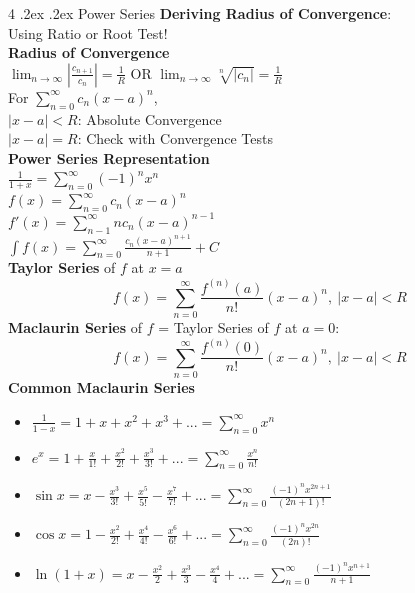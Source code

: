 \documentclass[10pt,landscape,a4paper]{article}
\makeatletter
\renewcommand{\section}{\@startsection{section}{1}{0mm}%
                                {.2ex}%
                                {.2ex}%
                                {\color{myblue}\sffamily\small\bfseries}}
\makeatother
\begin{document}
\begin{multicols*}{4}
\section{Power Series}
\textbf{Deriving Radius of Convergence}:\\Using Ratio or Root Test!\\
\textbf{Radius of Convergence}\\
$\lim_{n\to\infty}\left|\frac{c_{n+1}}{c_n}\right|=\frac{1}{R}$ OR $\lim_{n\to\infty}\sqrt[n]{\left|c_n\right|}=\frac{1}{R}$\\
For $\sum_{n=0}^{\infty}c_n(x-a)^n$,\\$\left|x-a\right|<R$: Absolute Convergence\\
$\left|x-a\right|=R$: Check with Convergence Tests\\
\textbf{Power Series Representation}\\
$\frac{1}{1+x}=\sum_{n=0}^{\infty}(-1)^nx^n$\\
$f(x)=\sum_{n=0}^{\infty}c_n(x-a)^n$\\
$f'(x)=\sum_{n-1}^{\infty}nc_n(x-a)^{n-1}$\\
$\int f(x)=\sum_{n=0}^{\infty}\frac{c_n(x-a)^{n+1}}{n+1}+C$\\
\textbf{Taylor Series} of $f$ at $x=a$
\[f(x)=\sum_{n=0}^{\infty}\frac{f^{(n)}(a)}{n!}(x-a)^n,\ \left|x-a\right|<R\]
\textbf{Maclaurin Series} of $f$ = Taylor Series of $f$ at $a=0$:
\[f(x)=\sum_{n=0}^{\infty}{\frac{f^{(n)}(0)}{n!}(x-a)^n},\ \left|x-a\right|<R\]
\textbf{Common Maclaurin Series}
\begin{itemize}
   \item $\frac{1}{1-x}=1+x+x^2+x^3+...=\sum_{n=0}^{\infty}x^n$
   \item $e^x=1+\frac{x}{1!}+\frac{x^2}{2!}+\frac{x^3}{3!}+...=\sum_{n=0}^{\infty}\frac{x^n}{n!}$
   \item $\sin x=x-\frac{x^3}{3!}+\frac{x^5}{5!}-\frac{x^7}{7!}+...=\sum_{n=0}^{\infty}\frac{(-1)^nx^{2n+1}}{(2n+1)!}$
   \item $\cos x=1-\frac{x^2}{2!}+\frac{x^4}{4!}-\frac{x^6}{6!}+...=\sum_{n=0}^{\infty}\frac{(-1)^nx^{2n}}{(2n)!}$
   \item $\ln(1+x)=x-\frac{x^2}{2}+\frac{x^3}{3}-\frac{x^4}{4}+...=\sum_{n=0}^{\infty}\frac{(-1)^nx^{n+1}}{n+1}$
\end{itemize}

\end{multicols*}
\end{document}
